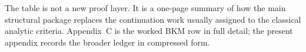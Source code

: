 \begin{remark}
The table is not a new proof layer. It is a one-page summary of how the main structural package
replaces the continuation work usually assigned to the classical analytic criteria. Appendix~C is the
worked BKM row in full detail; the present appendix records the broader ledger in compressed form.
\end{remark}



\clearpage
